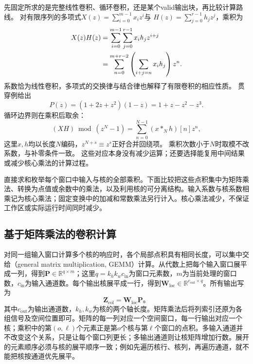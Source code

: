 先固定所求的是完整线性卷积、循环卷积，还是某个valid输出块，再比较计算路线。
对有限序列的多项式$X(z)=\sum_{i=0}^{m-1}x_i z^i$与
$H(z)=\sum_{j=0}^{r-1}h_jz^j$，乘积为
\begin{align}
  X(z)H(z)
  &=\sum_{i=0}^{m-1}\sum_{j=0}^{r-1}x_i h_jz^{i+j}\notag\\
  &=\sum_{n=0}^{m+r-2}\left(\sum_{i+j=n}x_i h_j\right)z^n.
  \label{eq:signal-analysis-polynomial-convolution}
\end{align}
系数恰为线性卷积，多项式的交换律与结合律也解释了有限卷积的相应性质。
贯穿例给出
\begin{equation}
  P(z)=(1+2z+z^2)(1-z)=1+z-z^2-z^3.
  \label{eq:signal-analysis-running-polynomial-product}
\end{equation}
循环边界则在乘积后取余：
\begin{equation}
  (XH)\bmod(z^N-1)=\sum_{n=0}^{N-1}(x*_Nh)[n]z^n,
  \label{eq:signal-analysis-polynomial-circular-convolution}
\end{equation}
这里$x,h$均以长度$N$编码，$z^{N+s}\equiv z^s$正好合并回绕项。
乘积次数小于$N$时取模不改系数，与补零条件一致。
这些对应本身没有减少运算；还要选择能复用中间结果或减少核心乘法的计算过程。

直接求和枚举每个窗口中输入与核的全部乘积。下面比较把这些点积集中为矩阵乘法、转换为点值或余数中的乘法，以及利用核的可分离结构。输入系数与核系数相乘记为核心乘法；固定变换中的加减和常数乘法另行计入。核心乘法减少，不保证工作区或实际运行时间同时减少。

\subsection{基于矩阵乘法的卷积计算}\label{sec:signal-analysis-fast-matrix}
\label{sec:cnn-matrix-algorithm}

对同一组输入窗口计算多个核的响应时，各个局部点积具有相同长度，可以集中交给（general matrix multiplication, GEMM）计算。从代数上把每个输入窗口展平成一列，得到$\bm P\in\mathbb R^{q\times m}$；这里$q=k_hk_wc_{\mathrm{in}}$为窗口元素数，$m$为当前处理的窗口数，$c_{\mathrm{in}}$为输入通道数。每个输出核展平成一行，得到$\bm W_{\mathrm{loc}}\in\mathbb R^{c_{\mathrm{out}}\times q}$。所有输出写为
\begin{equation}
  \bm Z_{\mathrm{col}}=\bm W_{\mathrm{loc}}\bm P\text{。}
  \label{eq:signal-analysis-window-matrix-product}
\end{equation}
其中$c_{\mathrm{out}}$为输出通道数，$k_h,k_w$为核的两个轴长度。矩阵乘法后将列索引还原为各组信号及空间位置即可。矩阵的每一列对应一个空间窗口，每一行输出对应一个核；乘积中的第$(o,\ell)$个元素正是第$o$个核与第$\ell$个窗口的点积。多输入通道并不改变这个关系，只是让每个窗口列更长；多输出通道则让核矩阵增加行数。展开的元素顺序必须与核的展平顺序一致；例如先遍历核行、核列，再遍历通道，就不能把核按通道优先展平。

